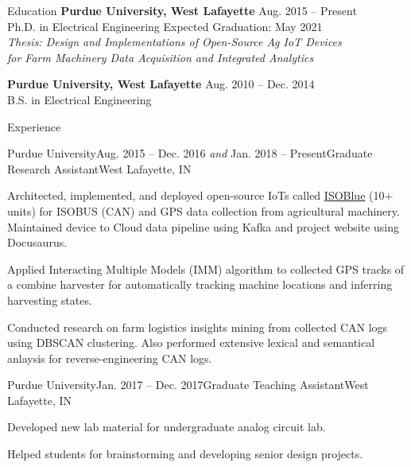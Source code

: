 \documentclass{resume}
\begin{document}
  \begin{rSection}{Education}
    {\bf Purdue University, West Lafayette} \hfill {Aug. 2015 -- Present}
    \\ 
    {Ph.D. in Electrical Engineering} \hfill {Expected Graduation: May 2021} \\
    \textit{Thesis: Design and Implementations of Open-Source Ag IoT Devices \\
      for Farm Machinery Data Acquisition and Integrated Analytics}

    {\bf Purdue University, West Lafayette} \hfill {Aug. 2010 -- Dec. 2014}
    \\ 
    {B.S. in Electrical Engineering} \\
  \end{rSection}

  \begin{rSection}{Experience}
    \begin{rSubsection}{Purdue University}{Aug. 2015 -- Dec. 2016 \textit{and}
        Jan. 2018 -- Present}{Graduate Research Assistant}{West Lafayette, IN}
      \item Architected, implemented, and deployed open-source IoTs called
        \href{https://www.isoblue.org/}{ISOBlue} (10+ units) for ISOBUS (CAN)
        and GPS data collection from agricultural machinery. Maintained device
        to Cloud data pipeline using Kafka and project website using
        Docusaurus.
      \item Applied Interacting Multiple Models (IMM) algorithm to collected
        GPS tracks of a combine harvester for automatically tracking machine
        locations and inferring harvesting states.
      \item Conducted research on farm logistics insights mining from collected
        CAN logs using DBSCAN clustering. Also performed extensive lexical and
        semantical anlaysis for reverse-engineering CAN logs. 
    \end{rSubsection}

    \begin{rSubsection}{Purdue University}{Jan. 2017 --
        Dec. 2017}{Graduate Teaching Assistant}{West Lafayette, IN}
      \item Developed new lab material for undergraduate analog circuit lab.
      \item Helped students for brainstorming and developing senior design
        projects. 
    \end{rSubsection}


\end{rSection}
\end{document}
